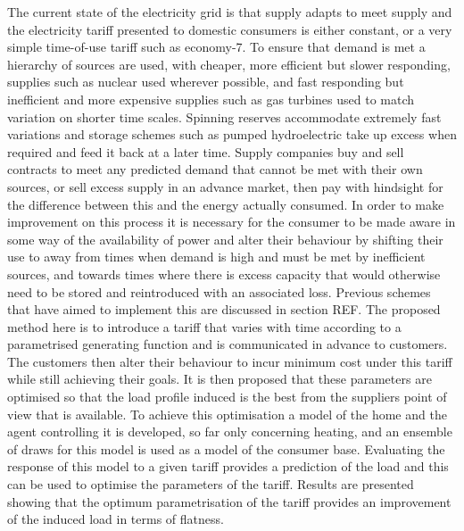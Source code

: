 \documentclass[a4paper, 10 pt, conference]{ieeeconf}  %
\begin{document}
The current state of the electricity grid is that supply adapts to meet supply and the electricity tariff presented to domestic consumers is either constant, or a very simple time-of-use tariff such as economy-7. To ensure that demand is met a hierarchy of sources are used, with cheaper, more efficient but slower responding, supplies such as nuclear used wherever possible, and fast responding but inefficient and more expensive supplies such as gas turbines used to match variation on shorter time scales. Spinning reserves accommodate extremely fast variations and storage schemes such as pumped hydroelectric take up excess when required and feed it back at a later time.
Supply companies buy and sell contracts to meet any predicted demand that cannot be met with their own sources, or sell excess supply in an advance market, then pay with hindsight for the difference between this and the energy actually consumed.
In order to make improvement on this process it is necessary for the consumer to be made aware in some way of the availability of power and alter their behaviour by shifting their use to away from times when demand is high and must be met by inefficient sources, and towards times where there is excess capacity that would otherwise need to be stored and reintroduced with an associated loss. Previous schemes that have aimed to implement this are discussed in section REF. The proposed method here is to introduce a tariff that varies with time according to a parametrised generating function and is communicated in advance to customers. The customers then alter their behaviour to incur minimum cost under this tariff while still achieving their goals. It is then proposed that these parameters are optimised so that the load profile induced is the best from the suppliers point of view that is available.
To achieve this optimisation a model of the home and the agent controlling it is developed, so far only concerning heating, and an ensemble of draws for this model is used as a model of the consumer base. Evaluating the response of this model to a given tariff provides a prediction of the load and this can be used to optimise the parameters of the tariff. Results are presented showing that the optimum parametrisation of the tariff provides an improvement of the induced load in terms of flatness.


\end{document}
